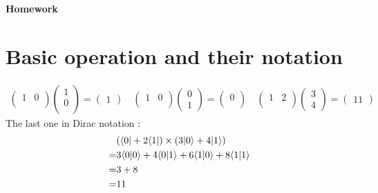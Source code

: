 \documentclass[12pt]{article}
\theoremstyle{exostyle}
\begin{document}
\begin{center}
{\bf {\Large  Homework}}\\
\end{center}

\section{Basic operation and their notation}


\begin{align*}
\left(\begin{array}{cccc}
 1 &0 \\
\end{array}\right)
\left(\begin{array}{c}
 1\\
 0 \\
\end{array}\right) =
\left(\begin{array}{c}
 1
\end{array}\right)
\quad
\left(\begin{array}{cccc}
 1 &0 \\
\end{array}\right)
\left(\begin{array}{c}
 0\\
 1
\end{array}\right) =
\left(\begin{array}{c}
 0\\
\end{array}\right)
\quad
\left(\begin{array}{cccc}
 1 &2 \\
\end{array}\right)
\left(\begin{array}{c}
 3\\
 4
\end{array}\right) =
\left(\begin{array}{c}
 11
\end{array}\right)
\end{align*}
The last one in Dirac notation :
\begin{align*}
  & (\langle 0 | + 2\langle 1 |) \times (3| 0 \rangle + 4 | 1 \rangle) \\
  =& 3\langle 0 | 0 \rangle + 4 \langle 0 | 1 \rangle + 6 \langle 1 | 0 \rangle + 8 \langle 1 | 1 \rangle \\
  =& 3 + 8 \\
  =& 11
\end{align*}
\end{document}
